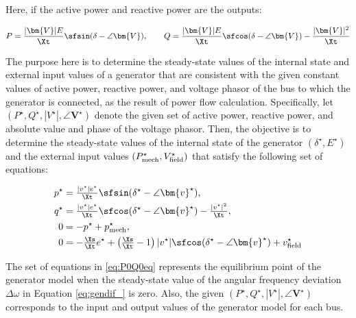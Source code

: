 \documentclass[graybox, envcountchap]{svmult}
\begin{document}
Here, if the active power and reactive power are the outputs:

\begin{equation}\label{eq:PQout_}
  P =  \frac{|\bm{V} | E}{ \Xt } \sfsin(\delta -  \angle \bm{V}), \qquad
  Q =  \frac{|\bm{V}|E}{ \Xt } \sfcos (\delta - \angle \bm{V})
  -\frac{|\bm{V}|^2}{ \Xt }
\end{equation}

The purpose here is to determine the steady-state values of the internal state
and external input values of a generator that are consistent with the given
constant values of active power, reactive power, and voltage phasor of the bus
to which the generator is connected, as the result of power flow calculation.
Specifically, let $(P^{\star},Q^{\star},|V^{\star}|,\angle \bm{V}^{\star})$
denote the given set of active power, reactive power, and absolute value and
phase of the voltage phasor. Then, the objective is to determine the
steady-state values of the internal state of the generator
$(\delta^{\star},E^{\star})$ and the external input values $(P_{{\rm
mech}}^{\star},V_{{\rm field}}^{\star})$ that satisfy the following set of
equations:

\begin{equation}\label{eq:P0Q0eq}
  \begin{aligned}
    p^{\star} &=  \tfrac{|v^{\star}| e^{\star}}{ \Xt } \sfsin(\delta^{\star} -  \angle \bm{v}^{\star}), \\
    q^{\star} & = \tfrac{|v^{\star}| e^{\star}}{ \Xt } \sfcos (\delta^{\star} -  \angle \bm{v}^{\star})
    -\tfrac{|v^{\star}|^2}{ \Xt }, \\
    0 & =  - p^{\star} +p_{{\rm mech}}^{\star}, \\
    0 & = 
    -\tfrac{ \Xs }{ \Xt }e^{\star}
    +\left(
    \tfrac{ \Xs }{ \Xt }-1
    \right)
    |v^{\star}| \sfcos (\delta^{\star} - \angle \bm{v}^{\star})
    + v_{{\rm field}}^{\star}
  \end{aligned}
\end{equation}

The set of equations in \ref{eq:P0Q0eq} represents the equilibrium point of the
generator model when the steady-state value of the angular frequency deviation
$\Delta \omega$ in Equation \ref{eq:gendif_} is zero. Also, the given
$(P^{\star},Q^{\star},|V^{\star}|,\angle \bm{V}^{\star})$ corresponds to the
input and output values of the generator model for each bus.
\end{document}
